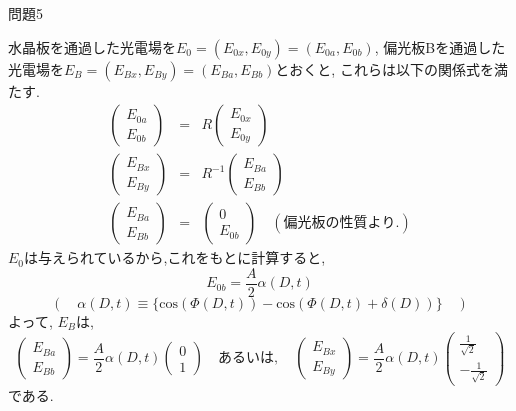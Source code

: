 \documentclass[fleqn]{jbook}
\begin{document}
\begin{answer}{問題5}{}
\begin{enumerate}
水晶板を通過した光電場を$E_0=(E_{0x}, E_{0y})=(E_{0a}, E_{0b})$,
 偏光板Bを通過した光電場を$E_B=(E_{Bx}, E_{By})=(E_{Ba}, E_{Bb})$とおくと,
これらは以下の関係式を満たす.
\begin{eqnarray*}
 \left(
  \begin{array}{c}
   E_{0a} \\ E_{0b}
  \end{array}
 \right)
 & = &
 R
 \left(
  \begin{array}{c}
   E_{0x} \\ E_{0y}
  \end{array}
 \right)
 \\
 \left(
  \begin{array}{c}
   E_{Bx} \\ E_{By}
  \end{array}
 \right)
 & = &
 R^{-1}
 \left(
  \begin{array}{c}
   E_{Ba} \\ E_{Bb}
  \end{array}
 \right)
 \\
 \left(
  \begin{array}{c}
   E_{Ba} \\ E_{Bb}
  \end{array}
 \right)
 & = &
 \left(
  \begin{array}{c}
   0 \\ E_{0b}
  \end{array}
 \right)
 \quad
 (偏光板の性質より.)
\end{eqnarray*}
$E_0$は与えられているから,これをもとに計算すると,
\[
 E_{0b} = \frac{A}{2} \alpha(D, t)
\]
\[
 ( \quad
 \alpha(D, t)
  \equiv
 \{\mathrm{cos}(\Phi(D, t)) - \mathrm{cos}(\Phi(D, t)+\delta(D)) \}
 \quad )
\]
よって, $E_B$は,
\[
 \left(
  \begin{array}{c}
   E_{Ba} \\ E_{Bb}
  \end{array}
 \right)
  = 
  \frac{A}{2} \alpha(D, t)
 \left(
  \begin{array}{c}
   0 \\ 1
  \end{array}
 \right)
\quad
あるいは,
\quad
 \left(
  \begin{array}{c}
   E_{Bx} \\ E_{By}
  \end{array}
 \right)
  = 
  \frac{A}{2} \alpha(D, t)
 \left(
  \begin{array}{c}
   \frac{1}{\sqrt{2}} \\ -\frac{1}{\sqrt{2}}
  \end{array}
 \right)
\]
である.



\end{enumerate}
\end{answer}
\end{document}
